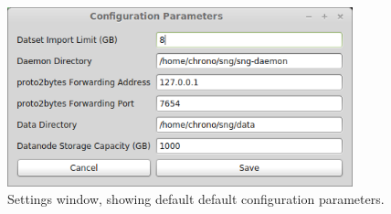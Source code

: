\begin{figure}[h!]
\begin{center}
\includegraphics[width=10cm]{screenshots/settings.png}
\end{center}
\caption{Settings window, showing default default configuration parameters.}
\label{fig_settings}
\end{figure}









